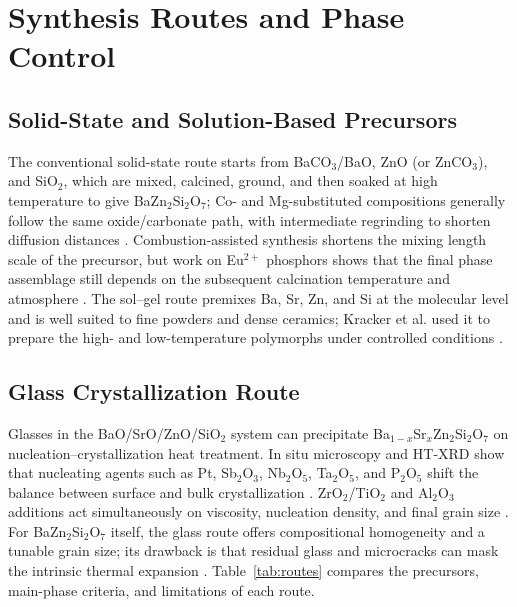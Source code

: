 \section{Synthesis Routes and Phase Control}

\subsection{Solid-State and Solution-Based Precursors}

The conventional solid-state route starts from BaCO$_3$\slash BaO, ZnO (or ZnCO$_3$), and SiO$_2$, which are mixed, calcined, ground, and then soaked at high temperature to give BaZn$_2$Si$_2$O$_7$; Co- and Mg-substituted compositions generally follow the same oxide/carbonate path, with intermediate regrinding to shorten diffusion distances \cite{kerstan2013bazn2si2o7,thieme2016new}. Combustion-assisted synthesis shortens the mixing length scale of the precursor, but work on Eu$^{2+}$ phosphors shows that the final phase assemblage still depends on the subsequent calcination temperature and atmosphere \cite{yao2010synthesis,yao2010synthesisx}. The sol--gel route premixes Ba, Sr, Zn, and Si at the molecular level and is well suited to fine powders and dense ceramics; Kracker et al. used it to prepare the high- and low-temperature polymorphs under controlled conditions \cite{kracker2016sol}.

\subsection{Glass Crystallization Route}

Glasses in the BaO\slash SrO\slash ZnO\slash SiO$_2$ system can precipitate Ba$_{1-x}$Sr$_x$Zn$_2$Si$_2$O$_7$ on nucleation--crystallization heat treatment. In situ microscopy and HT\nobreakdash-XRD show that nucleating agents such as Pt, Sb$_2$O$_3$, Nb$_2$O$_5$, Ta$_2$O$_5$, and P$_2$O$_5$ shift the balance between surface and bulk crystallization \cite{bocker2012in,vladislavova2017heterogeneous,vladislavova2019crystallization,heitmann2019surface,thieme2017on,vladislavova2018nucleation}. ZrO$_2$\slash TiO$_2$ and Al$_2$O$_3$ additions act simultaneously on viscosity, nucleation density, and final grain size \cite{vladislavova2018crystallisation,thieme2017effect}. For BaZn$_2$Si$_2$O$_7$ itself, the glass route offers compositional homogeneity and a tunable grain size; its drawback is that residual glass and microcracks can mask the intrinsic thermal expansion \cite{thieme2016thermal,thieme2015high}. Table~\ref{tab:routes} compares the precursors, main-phase criteria, and limitations of each route.

